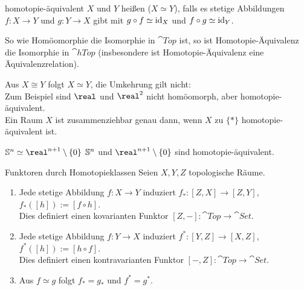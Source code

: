 \linie
\pagebreak

\begin{Def}{homotopie-äquivalent}
    $X$ und $Y$ heißen  ($X \simeq Y$),
    falls es stetige Abbildungen $f\colon X \rightarrow Y$ und
    $g\colon Y \rightarrow X$ gibt mit $g \circ f \simeq \operatorname{id}_X$ und
    $f \circ g \simeq \operatorname{id}_Y$.
\end{Def}

\begin{Bem}
    So wie Homöomorphie die Isomorphie in $\cat{Top}$ ist, so ist
    Homotopie-Äquivalenz die Isomorphie in $\cat{hTop}$
    (insbesondere ist Homotopie-Äquivalenz eine Äquivalenzrelation).
\end{Bem}

\begin{Bsp}
    Aus $X \cong Y$ folgt $X \simeq Y$, die Umkehrung gilt nicht: \\
    Zum Beispiel sind $\real$ und $\real^2$ nicht homöomorph, aber
    homotopie-äquivalent. \\
    Ein Raum $X$ ist zusammenziehbar genau dann, wenn $X$ zu $\{\ast\}$
    homotopie-äquivalent ist.
\end{Bsp}

\begin{Satz}{$\sphere^n \simeq \real^{n+1} \setminus \{0\}$}
    $\mathbb{S}^n$ und $\real^{n+1} \setminus \{0\}$
    sind homotopie-äquivalent.
\end{Satz}

\begin{Satz}{Funktoren durch Homotopieklassen}
    Seien $X, Y, Z$ topologische Räume.
    \begin{enumerate}
        \item
        Jede stetige Abbildung $f\colon X \rightarrow Y$ induziert
        $f_\ast\colon [Z, X] \rightarrow [Z, Y]$,
        $f_\ast([h]) := [f \circ h]$. \\
        Dies definiert einen kovarianten Funktor
        $[Z, -]\colon \cat{Top} \rightarrow \cat{Set}$.
        
        \item
        Jede stetige Abbildung $f\colon Y \rightarrow X$ induziert
        $f^\ast\colon [Y, Z] \rightarrow [X, Z]$,
        $f^\ast([h]) := [h \circ f]$. \\
        Dies definiert einen kontravarianten Funktor
        $[-, Z]\colon \cat{Top} \rightarrow \cat{Set}$.
        
        \item
        Aus $f \simeq g$ folgt $f_\ast = g_\ast$ und $f^\ast = g^\ast$.
    \end{enumerate}
\end{Satz}

